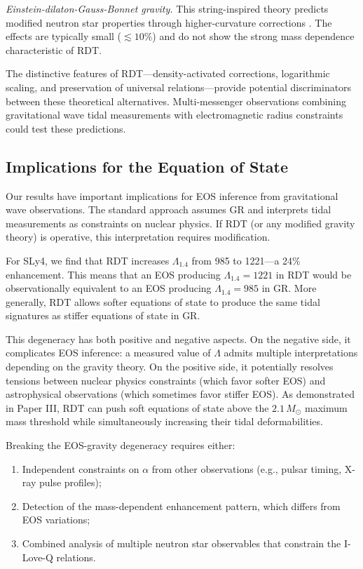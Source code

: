 \documentclass[twocolumn,showpacs,preprintnumbers,amsmath,amssymb,prd]{revtex4-2}
\begin{document}
\textit{Einstein-dilaton-Gauss-Bonnet gravity.} This string-inspired theory predicts modified neutron star properties through higher-curvature corrections \cite{Pani2011,Kleihaus2014}. The effects are typically small ($\lesssim 10\%$) and do not show the strong mass dependence characteristic of RDT.

The distinctive features of RDT---density-activated corrections, logarithmic scaling, and preservation of universal relations---provide potential discriminators between these theoretical alternatives. Multi-messenger observations combining gravitational wave tidal measurements with electromagnetic radius constraints could test these predictions.

\subsection{Implications for the Equation of State}
\label{sec:discussion_eos}

Our results have important implications for EOS inference from gravitational wave observations. The standard approach assumes GR and interprets tidal measurements as constraints on nuclear physics. If RDT (or any modified gravity theory) is operative, this interpretation requires modification.

For SLy4, we find that RDT increases $\Lambda_{1.4}$ from 985 to 1221---a 24\% enhancement. This means that an EOS producing $\Lambda_{1.4} = 1221$ in RDT would be observationally equivalent to an EOS producing $\Lambda_{1.4} = 985$ in GR. More generally, RDT allows softer equations of state to produce the same tidal signatures as stiffer equations of state in GR.

This degeneracy has both positive and negative aspects. On the negative side, it complicates EOS inference: a measured value of $\Lambda$ admits multiple interpretations depending on the gravity theory. On the positive side, it potentially resolves tensions between nuclear physics constraints (which favor softer EOS) and astrophysical observations (which sometimes favor stiffer EOS). As demonstrated in Paper III, RDT can push soft equations of state above the $2.1\,M_\odot$ maximum mass threshold while simultaneously increasing their tidal deformabilities.

Breaking the EOS-gravity degeneracy requires either:
\begin{enumerate}
\item Independent constraints on $\alpha$ from other observations (e.g., pulsar timing, X-ray pulse profiles);
\item Detection of the mass-dependent enhancement pattern, which differs from EOS variations;
\item Combined analysis of multiple neutron star observables that constrain the I-Love-Q relations.
\end{enumerate}
\end{document}
